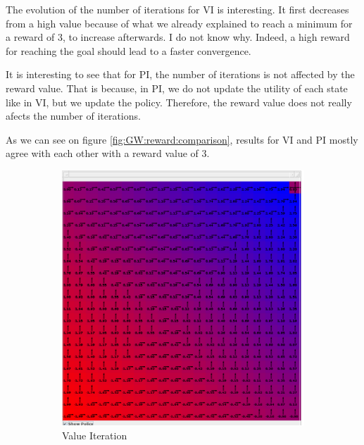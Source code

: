 \documentclass[10pt, twocolumn]{article}
\begin{document}
				The evolution of the number of iterations for VI is interesting. It first decreases from a high value because of what we already explained to reach a minimum for a reward of 3, to increase afterwards. I do not know why. Indeed, a high reward for reaching the goal should lead to a faster convergence.

				It is interesting to see that for PI, the number of iterations is not affected by the reward value. That is because, in PI, we do not update the utility of each state like in VI, but we update the policy. Therefore, the reward value does not really afects the number of iterations.

				As we can see on figure \ref{fig:GW:reward:comparison}, results for VI and PI mostly agree with each other with a reward value of 3.

				\begin{figure}[]
					\centering
					\begin{subfigure}[t]{0.24\textwidth}
						\centering
						\includegraphics[width=\textwidth]{../graphics/GridWorld_3.0_vi_reward.png}
						\caption{Value Iteration}
						\label{fig:GW:reward:VI}
					\end{subfigure}
					\begin{subfigure}[t]{0.24\textwidth}
						\centering

\end{subfigure}
\end{figure}
\end{document}
